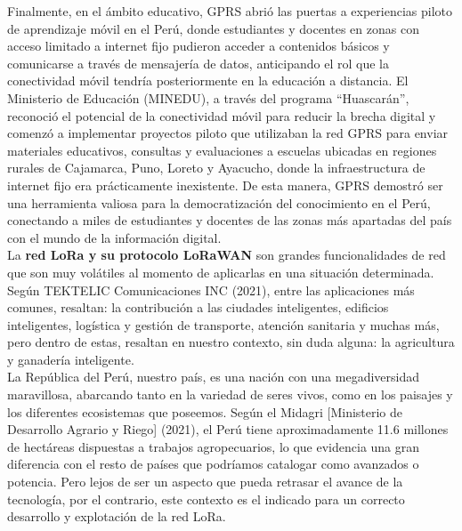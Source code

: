 \documentclass[12pt,a4paper]{article}
\begin{document}
	 Finalmente, en el ámbito educativo, GPRS abrió las puertas a experiencias piloto de aprendizaje móvil en el Perú, donde estudiantes y docentes en zonas con acceso limitado a internet fijo pudieron acceder a contenidos básicos y comunicarse a través de mensajería de datos, anticipando el rol que la conectividad móvil tendría posteriormente en la educación a distancia. El Ministerio de Educación (MINEDU), a través del programa “Huascarán”, reconoció el potencial de la conectividad móvil para reducir la brecha digital y comenzó a implementar proyectos piloto que utilizaban la red GPRS para enviar materiales educativos, consultas y evaluaciones a escuelas ubicadas en regiones rurales de Cajamarca, Puno, Loreto y Ayacucho, donde la infraestructura de internet fijo era prácticamente inexistente. De esta manera, GPRS demostró ser una herramienta valiosa para la democratización del conocimiento en el Perú, conectando a miles de estudiantes y docentes de las zonas más apartadas del país con el mundo de la información digital. \\
	
	La \textbf{red LoRa y su protocolo LoRaWAN} son grandes funcionalidades de red que son muy volátiles al momento de aplicarlas en una situación determinada. Según TEKTELIC Comunicaciones INC (2021), entre las aplicaciones más comunes, resaltan: la contribución a las ciudades inteligentes, edificios inteligentes, logística y gestión de transporte, atención sanitaria y muchas más, pero dentro de estas, resaltan en nuestro contexto, sin duda alguna: la agricultura y ganadería inteligente.\\

	La República del Perú, nuestro país, es una nación con una megadiversidad maravillosa, abarcando tanto en la variedad de seres vivos, como en los paisajes y los diferentes ecosistemas que poseemos. Según el Midagri [Ministerio de Desarrollo Agrario y Riego] (2021), el Perú tiene aproximadamente 11.6 millones de hectáreas dispuestas a trabajos agropecuarios, lo que evidencia una gran diferencia con el resto de países que podríamos catalogar como avanzados o potencia. Pero lejos de ser un aspecto que pueda retrasar el avance de la tecnología, por el contrario, este contexto es el indicado para un correcto desarrollo y explotación de la red LoRa.\\
	
\end{document}
